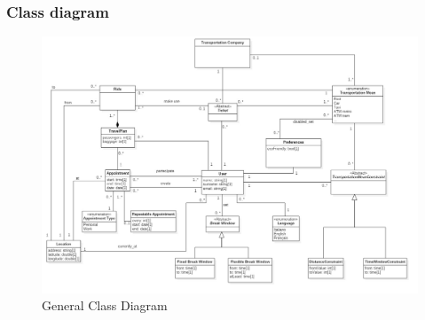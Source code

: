 	\subsubsection{Class diagram}
		\begin{figure}[H]
			\centerline{\includegraphics[width=\paperwidth-1]{Images/ClassDiagram}}
			\caption{General Class Diagram}
		\end{figure}
